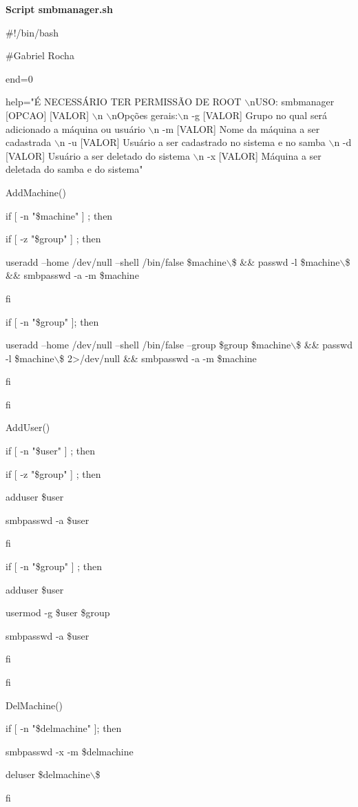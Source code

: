 \textbf{Script smbmanager.sh}

\#!/bin/bash

\#Gabriel Rocha

end=0

help="É NECESSÁRIO TER PERMISSÃO DE ROOT $\backslash$nUSO: smbmanager [OPCAO] [VALOR] $\backslash$n 
$\backslash$nOpções gerais:$\backslash$n -g [VALOR]   Grupo no qual será adicionado a máquina ou 
usuário  $\backslash$n -m [VALOR]   Nome da máquina a ser cadastrada $\backslash$n -u [VALOR]   Usuário a ser cadastrado no sistema e no samba $\backslash$n -d [VALOR]   Usuário a ser deletado do sistema $\backslash$n -x [VALOR]   Máquina a ser deletada do samba e do sistema"

AddMachine(){

if [ -n "\$machine" ] ; then

    if [ -z "\$group" ] ; then

        useradd --home /dev/null --shell /bin/false \$machine$\backslash$\$ \&\& passwd -l 
\$machine$\backslash$\$ \&\& smbpasswd -a -m \$machine

    fi

    if [ -n "\$group" ]; then

        useradd --home /dev/null --shell /bin/false --group \$group \$machine$\backslash$\$ \&\& passwd -l \$machine$\backslash$\$ 2>/dev/null \&\& smbpasswd -a -m \$machine        

    fi        

fi

}

AddUser(){

if [ -n "\$user" ] ; then

    if [ -z "\$group" ] ; then

        adduser \$user

        smbpasswd -a \$user

    fi

    if [ -n "\$group" ] ; then

        adduser \$user

        usermod -g \$user \$group

        smbpasswd -a \$user

    fi

fi

}



DelMachine(){

if [ -n "\$delmachine" ]; then    

    smbpasswd -x -m \$delmachine

    deluser \$delmachine$\backslash$\$

fi

}

